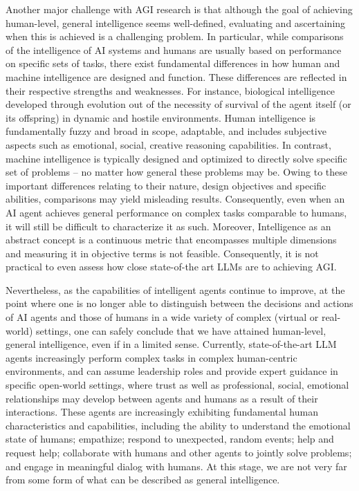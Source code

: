 \documentclass[10pt,journal,compsoc]{IEEEtran}
\begin{document}
	Another major challenge with AGI research is that although the goal of achieving human-level, general intelligence seems well-defined, evaluating and ascertaining when this is achieved is a challenging problem. In particular, while comparisons of the intelligence of AI systems and humans are usually based on performance on specific sets of tasks, there exist fundamental differences in how human and machine intelligence are designed and function. These differences are reflected in their respective strengths and weaknesses. For instance, biological intelligence developed through evolution out of the necessity of survival of the agent itself (or its offspring) in dynamic and hostile environments. Human intelligence is fundamentally fuzzy and broad in scope, adaptable, and includes subjective aspects such as emotional, social, creative reasoning capabilities. In contrast, machine intelligence is typically designed and optimized to directly solve specific set of problems – no matter how general these problems may be. Owing to these important differences relating to their nature, design objectives and specific abilities, comparisons may yield misleading results. Consequently, even when an AI agent achieves general performance on complex tasks comparable to humans, it will still be difficult to characterize it as such. Moreover, Intelligence as an abstract concept is a continuous metric that encompasses multiple dimensions and measuring it in objective terms is not feasible. Consequently, it is not practical to even assess how close state-of-the art LLMs are to achieving AGI. 
	
	
	Nevertheless, as the capabilities of intelligent agents continue to improve, at the point where one is no longer able to distinguish between the decisions and actions of AI agents and those of humans in a wide variety of complex (virtual or real-world) settings, one can safely conclude that we have attained human-level, general intelligence, even if in a limited sense. Currently, state-of-the-art LLM agents increasingly perform complex tasks in complex human-centric environments, and can assume leadership roles and provide expert guidance in specific open-world settings, where trust as well as professional, social, emotional relationships may develop between agents and humans as a result of their interactions. These agents are increasingly exhibiting fundamental human characteristics and capabilities, including the ability to understand the emotional state of humans; empathize; respond to unexpected, random events; help and request help; collaborate with humans and other agents to jointly solve problems; and engage in meaningful dialog with humans. At this stage, we are not very far from some form of what can be described as general intelligence.
	
\end{document}
